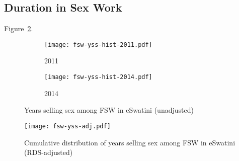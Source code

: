 \subsection{Duration in Sex Work}\label{app.model.fsw.dur}
Figure~\ref{fig:fsw.yss.adj}.
\begin{figure}
  \begin{subfigure}{0.5\linewidth}
    \texttt{[image: fsw-yss-hist-2011.pdf]}
    \caption{2011 \cite{Baral2014}}
  \end{subfigure}%
  \begin{subfigure}{0.5\linewidth}
    \texttt{[image: fsw-yss-hist-2014.pdf]}
    \caption{2014 \cite{EswKP2014}}
  \end{subfigure}
  \caption{Years selling sex among FSW in eSwatini (unadjusted)}
  \label{fig:fsw.yss.raw}
\end{figure}
\begin{figure}
  \centering
  \texttt{[image: fsw-yss-adj.pdf]}
  \caption{Cumulative distribution of years selling sex among FSW in eSwatini (RDS-adjusted)}
  \label{fig:fsw.yss.adj}
\end{figure}
\clearpage %